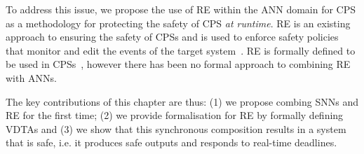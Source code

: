 To address this issue, we propose the use of \ac{RE} within the \ac{ANN} domain for \ac{CPS} as a methodology for protecting the safety of \ac{CPS} \textit{at runtime}.
\ac{RE} is an existing approach to ensuring the safety of \acp{CPS} and is used to enforce safety policies that monitor and edit the events of the target system~\cite{rta-cps}.
\ac{RE} is formally defined to be used in \acp{CPS}~\cite{recps}, however there has been no formal approach to combining \ac{RE} with \acp{ANN}. 

The key contributions of this chapter are thus: (1) we propose combing \acp{SNN} and \ac{RE} for the first time; (2) we provide formalisation for \ac{RE} by formally defining \acfp{VDTA} and (3) we show that this synchronous composition results in a system that is safe, i.e. it produces safe outputs and responds to real-time deadlines. 

